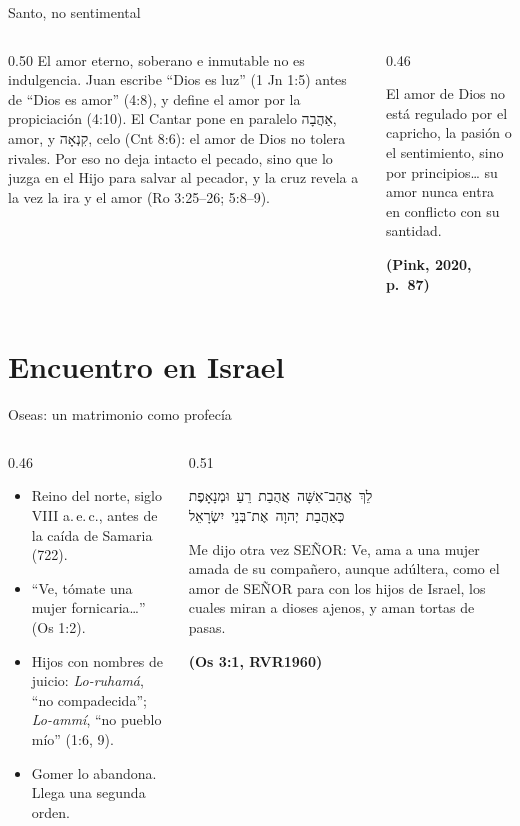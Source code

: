 \documentclass[hyperref={bookmarks=false},aspectratio=169]{beamer}
\newcommand{\heb}[1]{\mbox{\foreignlanguage{hebrew}{#1}}}
\newcommand{\SENOR}{S{\fontsize{0.78em}{1em}\selectfont EÑOR}}
\newcommand{\fuente}[1]{\par\hfill{\upshape\bfseries\footnotesize\textcolor{azul}{#1}}}
\begin{document}
\begin{frame}{Santo, no sentimental}
\begin{columns}[c,onlytextwidth]
\begin{column}{0.50\textwidth}\small
El amor eterno, soberano e inmutable no es indulgencia. Juan escribe ``Dios es luz'' (1 Jn 1:5) antes de ``Dios es amor'' (4:8), y define el amor por la propiciación (4:10). El Cantar pone en paralelo \heb{אַהֲבָה}, amor, y \heb{קִנְאָה}, celo (Cnt 8:6): el amor de Dios no tolera rivales. Por eso no deja intacto el pecado, sino que lo juzga en el Hijo para salvar al pecador, y la cruz revela a la vez la ira y el amor (Ro 3:25--26; 5:8--9).
\end{column}
\begin{column}{0.46\textwidth}
\begin{cita}El amor de Dios no está regulado por el capricho, la pasión o el sentimiento, sino por principios\ldots{} su amor nunca entra en conflicto con su santidad.\fuente{(Pink, 2020, p.~87)}\end{cita}
\end{column}
\end{columns}
\end{frame}

\section{Encuentro en Israel}

\begin{frame}{Oseas: un matrimonio como profecía}
\begin{columns}[t,onlytextwidth]
\begin{column}{0.46\textwidth}\small
\begin{itemize}
\item Reino del norte, siglo VIII a.\,e.\,c., antes de la caída de Samaria (722).
\item ``Ve, tómate una mujer fornicaria\ldots'' (Os 1:2).
\item Hijos con nombres de juicio: \emph{Lo-ruhamá}, ``no compadecida''; \emph{Lo-ammí}, ``no pueblo mío'' (1:6, 9).
\item Gomer lo abandona. Llega una segunda orden.
\end{itemize}
\end{column}
\begin{column}{0.51\textwidth}
\begin{center}\heb{לֵךְ אֱהַב־אִשָּׁה אֲהֻבַת רֵעַ וּמְנָאָפֶת}\\[1pt]\heb{כְּאַהֲבַת יְהוָה אֶת־בְּנֵי יִשְׂרָאֵל}\end{center}
\begin{cita}Me dijo otra vez \SENOR: Ve, ama a una mujer amada de su compañero, aunque adúltera, como el amor de \SENOR{} para con los hijos de Israel, los cuales miran a dioses ajenos, y aman tortas de pasas.\fuente{(Os 3:1, RVR1960)}\end{cita}
\end{column}
\end{columns}
\end{frame}
\end{document}

